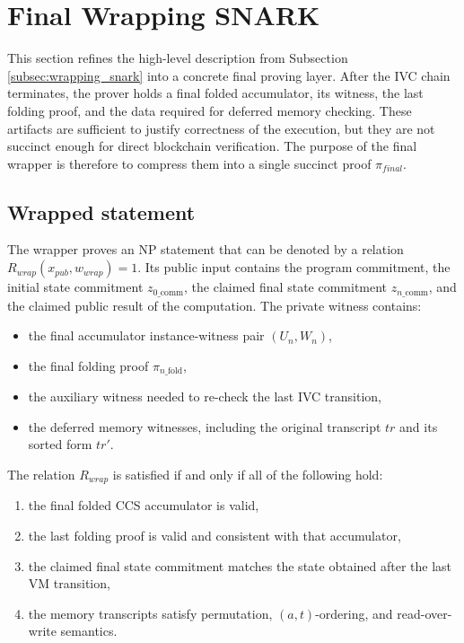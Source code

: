 \section{Final Wrapping SNARK}\label{sec:wrapping_snark_design}

This section refines the high-level description from Subsection
\ref{subsec:wrapping_snark} into a concrete final proving layer. After the IVC
chain terminates, the prover holds a final folded accumulator, its witness, the
last folding proof, and the data required for deferred memory checking. These
artifacts are sufficient to justify correctness of the execution, but they are
not succinct enough for direct blockchain verification. The purpose of the final
wrapper is therefore to compress them into a single succinct proof $\pi_{final}$.

\subsection{Wrapped statement}

The wrapper proves an NP statement that can be denoted by a relation
$R_{wrap}(x_{pub}, w_{wrap}) = 1$. Its public input contains the program
commitment, the initial state commitment $z_{0\_\text{comm}}$, the claimed
final state commitment $z_{n\_\text{comm}}$, and the claimed public result of
the computation. The private witness contains:

\begin{itemize}
	\item the final accumulator instance-witness pair $(U_n, W_n)$,
	\item the final folding proof $\pi_{n\_\text{fold}}$,
	\item the auxiliary witness needed to re-check the last IVC transition,
	\item the deferred memory witnesses, including the original transcript
	      $tr$ and its sorted form $tr'$.
\end{itemize}

The relation $R_{wrap}$ is satisfied if and only if all of the following hold:

\begin{enumerate}
	\item the final folded CCS accumulator is valid,
	\item the last folding proof is valid and consistent with that accumulator,
	\item the claimed final state commitment matches the state obtained after the
	      last VM transition,
	\item the memory transcripts satisfy permutation, $(a,t)$-ordering, and
	      read-over-write semantics.
\end{enumerate}

